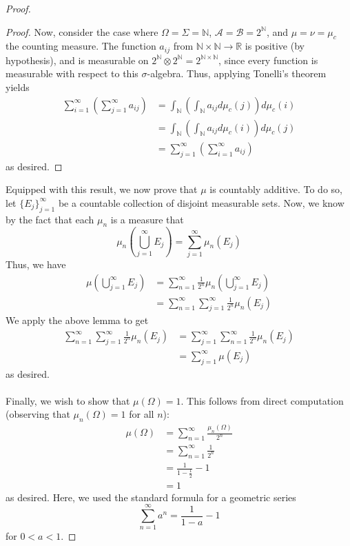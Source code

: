 \documentclass[fontsize=11pt]{scrartcl} %
\numberwithin{equation}{section} %
\numberwithin{figure}{section} %
\numberwithin{table}{section} %
\newcommand{\R}{\mathbb{R}}
\newcommand{\N}{\mathbb{N}}
\begin{document}
\begin{proof}
\begin{proof}
        Now, consider the case where $\Omega = \Sigma = \N$, $\mathscr{A} =
        \mathscr{B} = 2^{\N}$, and $\mu = \nu = \mu_c$ the counting measure.
        The function $a_{ij}$ from $\N\times\N\to\R$ is positive (by
        hypothesis), and is measurable on $2^{\N}\otimes 2^{\N} =
        2^{\N\times\N}$, since every function is measurable with respect to this
        $\sigma$-algebra. Thus, applying Tonelli's theorem yields
        \[
            \begin{aligned}
                \sum_{i=1}^{\infty}\left(\sum_{j=1}^{\infty}a_{ij}\right) &=
                \int_{\N}\left(\int_{\N}a_{ij}d\mu_c(j)\right)d\mu_c(i)\\
                &= \int_{\N}\left(\int_{\N}a_{ij}d\mu_c(i)\right)d\mu_c(j)\\
                &=\sum_{j=1}^{\infty}\left(\sum_{i=1}^{\infty}a_{ij}\right)
            \end{aligned}
        \]
        as desired.
    \end{proof}
    Equipped with this result, we now prove that $\mu$ is countably additive.
    To do so, let $\{E_j\}_{j=1}^{\infty}$ be a countable collection of disjoint
    measurable sets. Now, we know by the fact that each $\mu_n$ is a measure
    that
    \[
        \mu_n\left(\bigcup_{j=1}^{\infty}E_j\right) = \sum_{j=1}^{\infty}\mu_n(E_j)
    \]
    Thus, we have
    \[
        \begin{aligned}
            \mu\left(\bigcup_{j=1}^{\infty}E_j\right) &=
            \sum_{n=1}^{\infty}\frac{1}{2^n}\mu_n\left(\bigcup_{j=1}^{\infty}E_j\right)\\
            &=\sum_{n=1}^{\infty}\sum_{j=1}^{\infty}\frac{1}{2^n}\mu_n(E_j)
        \end{aligned}
    \]
    We apply the above lemma to get
    \[
        \begin{aligned}
            \sum_{n=1}^{\infty}\sum_{j=1}^{\infty}\frac{1}{2^n}\mu_n(E_j)
            &= \sum_{j=1}^{\infty}\sum_{n=1}^{\infty}\frac{1}{2^n}\mu_n(E_j)\\
            &=\sum_{j=1}^{\infty}\mu(E_j)
        \end{aligned}
    \]
    as desired.
    \\
    \\
    Finally, we wish to show that $\mu(\Omega) = 1$. This follows from direct
    computation (observing that $\mu_n(\Omega)=1$ for all $n$):
    \[
        \begin{aligned}
            \mu(\Omega) &= \sum_{n=1}^{\infty}\frac{\mu_n(\Omega)}{2^n}\\
            &= \sum_{n=1}^{\infty}\frac{1}{2^n}\\
            &= \frac{1}{1-\frac{1}{2}}-1\\
            &=1
        \end{aligned}
    \]
    as desired. Here, we used the standard formula for a geometric series
    \[
        \sum_{n=1}^{\infty}a^n = \frac{1}{1-a}-1
    \]
    for $0<a<1$.
\end{proof}
\end{document}
